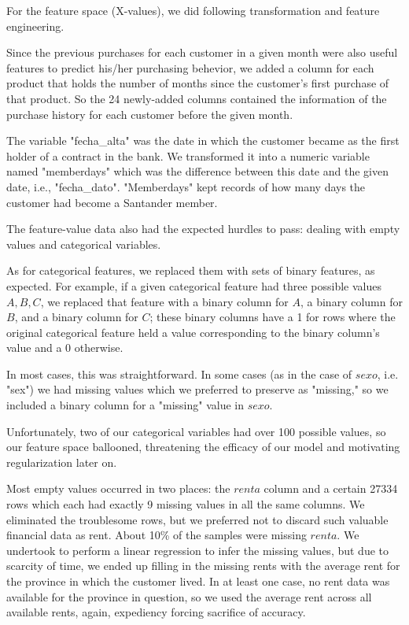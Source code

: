 \documentclass{report}
\begin{document}
For the feature space (X-values), we did following transformation and feature engineering.

Since the previous purchases for each customer in a given month were also useful features to predict his/her purchasing behevior, we added a column for each product that holds the number of months since the customer’s first purchase of that product. So the 24 newly-added columns contained the information of the purchase history for each customer before the given month. 

The variable "fecha\_alta" was the date in which the customer became as the first holder of a contract in the bank. We transformed it into a numeric variable named "memberdays" which was the difference between this date and the given date, i.e., "fecha\_dato". "Memberdays" kept records of how many days the customer had become a Santander member.

The feature-value data also had the expected hurdles to pass: dealing with empty values and categorical variables.

As for categorical features, we replaced them with sets of binary features, as expected. For example, if a given categorical feature had three possible values ${A,B,C}$, we replaced that feature with a binary column for $A$, a binary column for $B$, and a binary column for $C$; these binary columns have a 1 for rows where the original categorical feature held a value corresponding to the binary column's value and a 0 otherwise.

In most cases, this was straightforward. In some cases (as in the case of $sexo$, i.e. "sex") we had missing values which we preferred to preserve as "missing," so we included a binary column for a "missing" value in $sexo$.

Unfortunately, two of our categorical variables had over 100 possible values, so our feature space ballooned, threatening the efficacy of our model and motivating regularization later on.

Most empty values occurred in two places: the $renta$ column and a certain 27334 rows which each had exactly 9 missing values in all the same columns. We eliminated the troublesome rows, but we preferred not to discard such valuable financial data as rent. About 10\% of the samples were missing $renta$. We undertook to perform a linear regression to infer the missing values, but due to scarcity of time, we ended up filling in the missing rents with the average rent for the province in which the customer lived. In at least one case, no rent data was available for the province in question, so we used the average rent across all available rents, again, expediency forcing sacrifice of accuracy.
\end{document}
